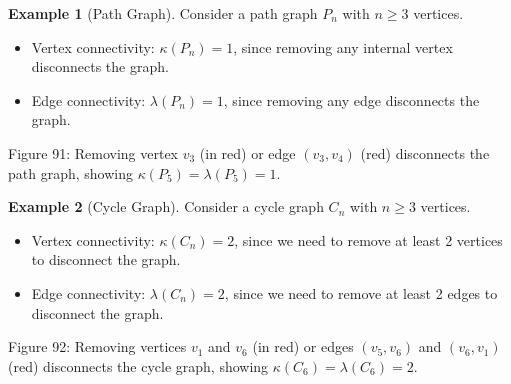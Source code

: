 \documentclass{article}
\theoremstyle{definition}
\newtheorem{example}{Example}
\begin{document}
\begin{example}[Path Graph]
Consider a path graph $P_n$ with $n \geq 3$ vertices.
\begin{itemize}
  \item Vertex connectivity: $\kappa(P_n) = 1$, since removing any internal vertex disconnects the graph.
  \item Edge connectivity: $\lambda(P_n) = 1$, since removing any edge disconnects the graph.
\end{itemize}
\begin{center}

\small Figure 91: Removing vertex $v_3$ (in red) or edge $(v_3,v_4)$ (red) disconnects the path graph, showing $\kappa(P_5) = \lambda(P_5) = 1$.
\end{center}
\end{example}

\begin{example}[Cycle Graph]
Consider a cycle graph $C_n$ with $n \geq 3$ vertices.
\begin{itemize}
  \item Vertex connectivity: $\kappa(C_n) = 2$, since we need to remove at least 2 vertices to disconnect the graph.
  \item Edge connectivity: $\lambda(C_n) = 2$, since we need to remove at least 2 edges to disconnect the graph.
\end{itemize}
\begin{center}

\small Figure 92: Removing vertices $v_1$ and $v_6$ (in red) or edges $(v_5,v_6)$ and $(v_6,v_1)$ (red) disconnects the cycle graph, showing $\kappa(C_6) = \lambda(C_6) = 2$.
\end{center}
\end{example}
\end{document}
